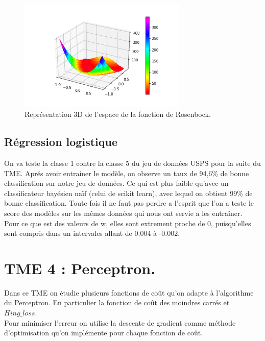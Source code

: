 \documentclass{article}
\begin{document}
\begin{figure}[h]
	\center
	\includegraphics[width=8cm]{figure/tme3/rosenBrock3D.png} 
	 \caption{Représentation 3D de l'espace de la fonction de Rosenbock.}
	 
\end{figure}
\clearpage
\subsection{Régression logistique}
On va teste la classe 1 contre la classe 5 du jeu de données USPS pour la suite du TME. Aprés avoir entrainer le modèle, on observe un taux de 94,6\% de bonne classification sur notre jeu de données. Ce qui est plus faible qu'avec un classificateur bayésien naïf (celui de scikit learn), avec lequel on obtient 99\% de bonne classification. Toute fois il ne faut pas perdre a l'esprit que l'on a teste le score des modèles sur les mêmes données qui nous ont servie a les entraîner.\\
Pour ce que est des valeurs de w, elles sont extrement proche de 0, puisqu'elles sont compris dans un intervales allant de 0.004 à -0.002.\\
\section{TME 4 : Perceptron.}
Dans ce TME on étudie plusieurs fonctions de coût qu'on adapte à l'algorithme du Perceptron. En particulier la fonction de coût des moindres carrés et $Hing\_loss$.\\
Pour minimiser l'erreur on utilise la descente de gradient comme méthode d'optimisation qu'on implémente pour chaque fonction de coût.\\
\end{document}
